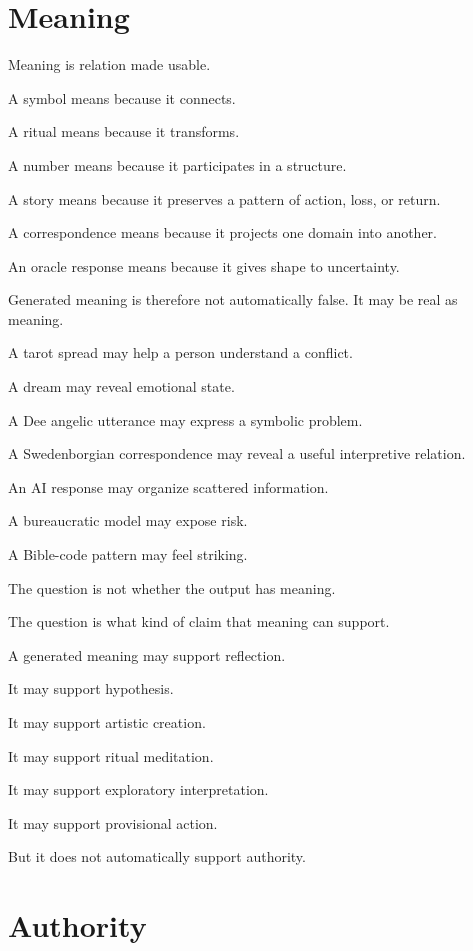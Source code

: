 \documentclass[11pt]{book}
\begin{document}
\section{Meaning}

Meaning is relation made usable.

A symbol means because it connects.

A ritual means because it transforms.

A number means because it participates in a structure.

A story means because it preserves a pattern of action, loss, or return.

A correspondence means because it projects one domain into another.

An oracle response means because it gives shape to uncertainty.

Generated meaning is therefore not automatically false. It may be real as meaning.

A tarot spread may help a person understand a conflict.

A dream may reveal emotional state.

A Dee angelic utterance may express a symbolic problem.

A Swedenborgian correspondence may reveal a useful interpretive relation.

An AI response may organize scattered information.

A bureaucratic model may expose risk.

A Bible-code pattern may feel striking.

The question is not whether the output has meaning.

The question is what kind of claim that meaning can support.

A generated meaning may support reflection.

It may support hypothesis.

It may support artistic creation.

It may support ritual meditation.

It may support exploratory interpretation.

It may support provisional action.

But it does not automatically support authority.

\section{Authority}
\end{document}
